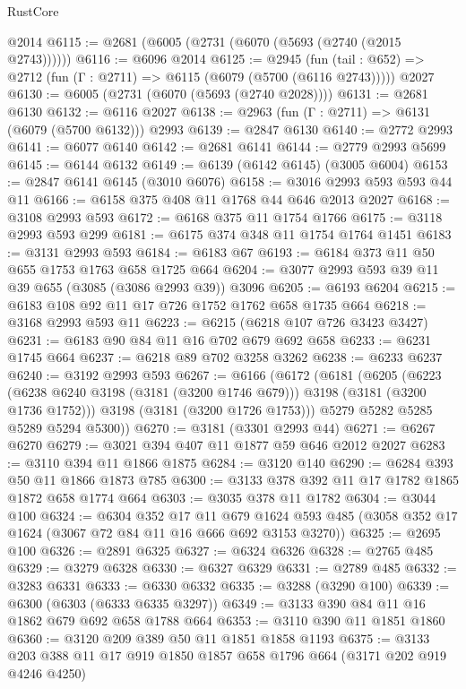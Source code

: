 \begin{lexlean}{RustCore}
\begin{coremodule}
    @2014
@6115 := @2681 (@6005 (@2731 (@6070 (@5693 (@2740 (@2015 @2743))))))
@6116 := @6096 @2014
@6125 := @2945
    (fun (tail : @652) => @2712 (fun (Γ : @2711) => @6115 (@6079 (@5700 (@6116 @2743)))))
    @2027
@6130 := @6005 (@2731 (@6070 (@5693 (@2740 @2028))))
@6131 := @2681 @6130
@6132 := @6116 @2027
@6138 := @2963 (fun (Γ : @2711) => @6131 (@6079 (@5700 @6132))) @2993
@6139 := @2847 @6130
@6140 := @2772 @2993
@6141 := @6077 @6140
@6142 := @2681 @6141
@6144 := @2779 @2993 @5699
@6145 := @6144 @6132
@6149 := @6139 (@6142 @6145) (@3005 @6004)
@6153 := @2847 @6141 @6145 (@3010 @6076)
@6158 := @3016 @2993 @593 @593 @44 @11
@6166 := @6158 @375 @408 @11 @1768 @44 @646 @2013 @2027
@6168 := @3108 @2993 @593
@6172 := @6168 @375 @11 @1754 @1766
@6175 := @3118 @2993 @593 @299
@6181 := @6175 @374 @348 @11 @1754 @1764 @1451
@6183 := @3131 @2993 @593
@6184 := @6183 @67
@6193 := @6184 @373 @11 @50 @655 @1753 @1763 @658 @1725 @664
@6204 := @3077 @2993 @593 @39 @11 @39 @655 (@3085 (@3086 @2993 @39)) @3096
@6205 := @6193 @6204
@6215 := @6183 @108 @92 @11 @17 @726 @1752 @1762 @658 @1735 @664
@6218 := @3168 @2993 @593 @11
@6223 := @6215 (@6218 @107 @726 @3423 @3427)
@6231 := @6183 @90 @84 @11 @16 @702 @679 @692 @658
@6233 := @6231 @1745 @664
@6237 := @6218 @89 @702 @3258 @3262
@6238 := @6233 @6237
@6240 := @3192 @2993 @593
@6267 := @6166
    (@6172
      (@6181
        (@6205
          (@6223 (@6238 @6240 @3198 (@3181 (@3200 @1746 @679))) @3198 (@3181 (@3200 @1736 @1752)))
          @3198
          (@3181 (@3200 @1726 @1753)))
        @5279
        @5282
        @5285
        @5289
        @5294
        @5300))
@6270 := @3181 (@3301 @2993 @44)
@6271 := @6267 @6270
@6279 := @3021 @394 @407 @11 @1877 @59 @646 @2012 @2027
@6283 := @3110 @394 @11 @1866 @1875
@6284 := @3120 @140
@6290 := @6284 @393 @50 @11 @1866 @1873 @785
@6300 := @3133 @378 @392 @11 @17 @1782 @1865 @1872 @658 @1774 @664
@6303 := @3035 @378 @11 @1782
@6304 := @3044 @100
@6324 := @6304
    @352
    @17
    @11
    @679
    @1624
    @593
    @485
    (@3058 @352 @17 @1624 (@3067 @72 @84 @11 @16 @666 @692 @3153 @3270))
@6325 := @2695 @100
@6326 := @2891 @6325
@6327 := @6324 @6326
@6328 := @2765 @485
@6329 := @3279 @6328
@6330 := @6327 @6329
@6331 := @2789 @485
@6332 := @3283 @6331
@6333 := @6330 @6332
@6335 := @3288 (@3290 @100)
@6339 := @6300 (@6303 (@6333 @6335 @3297))
@6349 := @3133 @390 @84 @11 @16 @1862 @679 @692 @658 @1788 @664
@6353 := @3110 @390 @11 @1851 @1860
@6360 := @3120 @209 @389 @50 @11 @1851 @1858 @1193
@6375 := @3133 @203 @388 @11 @17 @919 @1850 @1857 @658 @1796 @664 (@3171 @202 @919 @4246 @4250)

\end{coremodule}
\end{lexlean}
